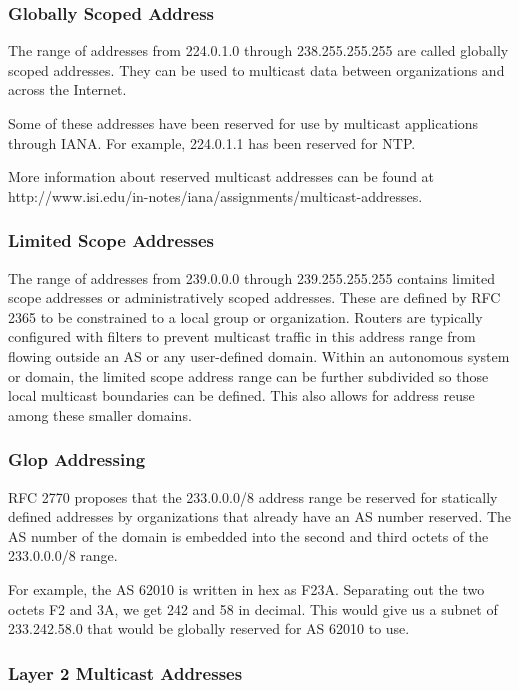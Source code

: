 \subsubsection{Globally Scoped Address}
\cite{cisco:multicast}
The range of addresses from 224.0.1.0 through 238.255.255.255 are called
globally scoped addresses. They can be used to multicast data between
organizations and across the Internet.

Some of these addresses have been reserved for use by multicast
applications through \ac{IANA}. For example, 224.0.1.1 has been reserved for
\ac{NTP}.

More information about reserved multicast addresses can be found at
http://www.isi.edu/in-notes/iana/assignments/multicast-addresses.


\subsubsection{Limited Scope Addresses}


\cite{cisco:multicast}
The range of addresses from 239.0.0.0 through 239.255.255.255 contains
limited scope addresses or administratively scoped addresses. These are
defined by RFC 2365 to be constrained to a local group or organization.
Routers are typically configured with filters to prevent multicast traffic
in this address range from flowing outside an \ac{AS} or any
user-defined domain. Within an autonomous system or domain, the limited
scope address range can be further subdivided so those local multicast
boundaries can be defined. This also allows for address reuse among these
smaller domains.

\subsubsection{Glop Addressing}
\cite{cisco:multicast}

RFC 2770 proposes that the 233.0.0.0/8 address range be reserved for
statically defined addresses by organizations that already have an AS
number reserved. The AS number of the domain is embedded into the second
and third octets of the 233.0.0.0/8 range.

For example, the AS 62010 is written in hex as F23A. Separating out the two
octets F2 and 3A, we get 242 and 58 in decimal. This would give us a subnet
of 233.242.58.0 that would be globally reserved for AS 62010 to use. 

\subsubsection{Layer 2 Multicast Addresses}

